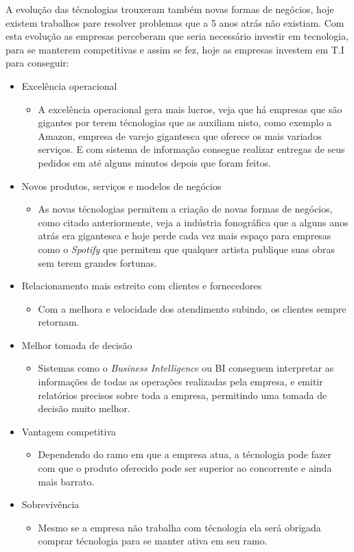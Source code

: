 \documentclass[
	12pt,				%
	openany,			%
	a4paper,			%
	chapter=TITLE,		%
	section=TITLE,		%
	english,
	brazil				%
]{abntex2}
\begin{document}
A evolução das técnologias trouxeram também novas formas de negócios, hoje existem trabalhos pare resolver problemas que a 5 anos atrás não existiam. Com esta evolução as empresas perceberam que seria necessário investir em tecnologia, para se manterem competitivas e assim se fez, hoje as empresas investem em T.I para conseguir:
\begin{itemize}
	\item Excelência operacional
		\begin{itemize}
			\item A excelência operacional gera mais lucros, veja que há empresas que são gigantes por terem técnologias que as auxiliam nisto, como exemplo a Amazon, empresa de varejo gigantesca que oferece os mais variados serviços. E com sistema de informação consegue realizar entregas de seus pedidos em até alguns minutos depois que foram feitos.
		\end{itemize}
	\item Novos produtos, serviços e modelos de negócios
		\begin{itemize}
			\item As novas técnologias permitem a criação de novas formas de negócios, como citado anteriormente, veja a indústria fonográfica que a alguns anos atrás era gigantesca e hoje perde cada vez mais espaço para empresas como o \textit{Spotify} que permitem que qualquer artista publique suas obras sem terem grandes fortunas.
		\end{itemize}
	\item Relacionamento mais estreito com clientes e fornecedores
		\begin{itemize}
			\item Com a melhora e velocidade dos atendimento subindo, os clientes sempre retornam.
		\end{itemize}
	\item Melhor tomada de decisão
		\begin{itemize}
			\item Sistemas como o \textit{Business Intelligence} ou BI conseguem interpretar as informações de todas as operações realizadas pela empresa, e emitir relatórios precisos sobre toda a empresa, permitindo uma tomada de decisão muito melhor.
		\end{itemize}
	\item Vantagem competitiva
		\begin{itemize}
			\item Dependendo do ramo em que a empresa atua, a técnologia pode fazer com que o produto oferecido pode ser superior ao concorrente e ainda mais barrato.
		\end{itemize}
	\item Sobrevivência
		\begin{itemize}
			\item Mesmo se a empresa não trabalha com técnologia ela será obrigada comprar técnologia para se manter ativa em seu ramo.
		\end{itemize}
\end{itemize}
\end{document}
